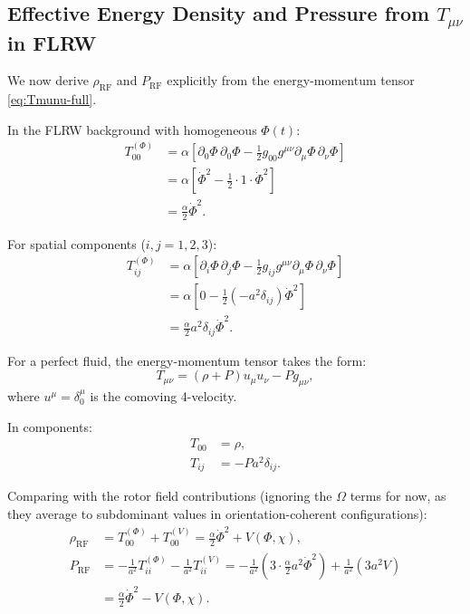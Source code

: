 \documentclass[11pt,a4paper]{article}
\numberwithin{equation}{section}
\theoremstyle{plain}
\theoremstyle{definition}
\theoremstyle{remark}
\begin{document}
\subsection{Effective Energy Density and Pressure from $T_{\mu\nu}$ in FLRW}

We now derive $\rho_{\mathrm{RF}}$ and $P_{\mathrm{RF}}$ explicitly from the energy-momentum tensor \eqref{eq:Tmunu-full}.

In the FLRW background with homogeneous $\Phi(t)$:
\begin{align}
T_{00}^{(\Phi)} &= \alpha\left[\partial_0\Phi\,\partial_0\Phi - \frac{1}{2}g_{00}g^{\mu\nu}\partial_\mu\Phi\,\partial_\nu\Phi\right]\\
&= \alpha\left[\dot{\Phi}^2 - \frac{1}{2}\cdot 1\cdot \dot{\Phi}^2\right]\\
&= \frac{\alpha}{2}\dot{\Phi}^2.
\end{align}

For spatial components ($i,j = 1,2,3$):
\begin{align}
T_{ij}^{(\Phi)} &= \alpha\left[\partial_i\Phi\,\partial_j\Phi - \frac{1}{2}g_{ij}g^{\mu\nu}\partial_\mu\Phi\,\partial_\nu\Phi\right]\\
&= \alpha\left[0 - \frac{1}{2}(-a^2\delta_{ij})\dot{\Phi}^2\right]\\
&= \frac{\alpha}{2}a^2\delta_{ij}\dot{\Phi}^2.
\end{align}

For a perfect fluid, the energy-momentum tensor takes the form:
\begin{equation}
T_{\mu\nu} = (\rho + P)u_\mu u_\nu - Pg_{\mu\nu},
\end{equation}
where $u^\mu = \delta^\mu_0$ is the comoving 4-velocity.

In components:
\begin{align}
T_{00} &= \rho,\\
T_{ij} &= -Pa^2\delta_{ij}.
\end{align}

Comparing with the rotor field contributions (ignoring the $\Omega$ terms for now, as they average to subdominant values in orientation-coherent configurations):
\begin{align}
\rho_{\mathrm{RF}} &= T_{00}^{(\Phi)} + T_{00}^{(V)} = \frac{\alpha}{2}\dot{\Phi}^2 + V(\Phi,\chi),\label{eq:rho-rf-derived}\\
P_{\mathrm{RF}} &= -\frac{1}{a^2}T_{ii}^{(\Phi)} - \frac{1}{a^2}T_{ii}^{(V)} = -\frac{1}{a^2}\left(3 \cdot \frac{\alpha}{2}a^2\dot{\Phi}^2\right) + \frac{1}{a^2}\left(3a^2 V\right)\\
&= \frac{\alpha}{2}\dot{\Phi}^2 - V(\Phi,\chi).
\label{eq:P-rf-derived}
\end{align}
\end{document}
